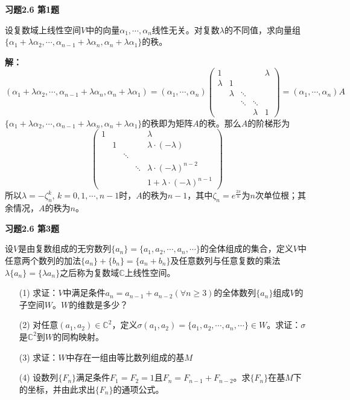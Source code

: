 \newpageorvspace

{\bf 习题2.6 第1题}

设复数域上线性空间$V$中的向量$\alpha_1,\cdots,\alpha_n$线性无关。对复数$\lambda$的不同值，求向量组$\{ \alpha_1+\lambda\alpha_2, \cdots, \alpha_{n-1}+\lambda\alpha_n, \alpha_n+\lambda\alpha_1 \}$的秩。

{\bf 解：}
$$(\alpha_1+\lambda\alpha_2, \cdots, \alpha_{n-1}+\lambda\alpha_n, \alpha_n+\lambda\alpha_1) = (\alpha_1,\cdots,\alpha_n) \begin{pmatrix}
1 & & & & \lambda \\ \lambda & 1 & & & \\ & \lambda & \ddots & & \\ & & \ddots & \ddots & \\ & & & \lambda & 1
\end{pmatrix} = (\alpha_1,\cdots,\alpha_n)A$$
$\{ \alpha_1+\lambda\alpha_2, \cdots, \alpha_{n-1}+\lambda\alpha_n, \alpha_n+\lambda\alpha_1 \}$的秩即为矩阵$A$的秩。那么$A$的阶梯形为
$$
\begin{pmatrix}
1 & & & & \lambda \\ & 1 & & & \lambda\cdot(-\lambda) \\ & & \ddots & & \\ & & & \ddots & \lambda\cdot(-\lambda)^{n-2} \\ & & & & 1 + \lambda\cdot(-\lambda)^{n-1}
\end{pmatrix}
$$
所以$\lambda = -\zeta_{n}^k$, $k=0,1,\cdots, n-1$时，$A$的秩为$n-1$，其中$\zeta_{n} = e^{\frac{2\pi}{n}}$为$n$次单位根；其余情况，$A$的秩为$n$。

\newpageorvspace

{\bf 习题2.6 第3题}

设$V$是由复数组成的无穷数列$\{a_n\} = \{ a_1,a_2,\cdots,a_n,\cdots \}$的全体组成的集合，定义$V$中任意两个数列的加法$\{a_n\} + \{b_n\} = \{a_n+b_n\}$及任意数列与任意复数的乘法$\lambda\{a_n\} = \{\lambda a_n\}$之后称为复数域$\mathbb{C}$上线性空间。
\begin{itemize}
\item[(1)] 求证：$V$中满足条件$a_n = a_{n-1}+a_{n-2} (\forall n \geqslant 3)$的全体数列$\{a_n\}$组成$V$的子空间$W$。$W$的维数是多少？
\item[(2)] 对任意$(a_1,a_2)\in\mathbb{C}^2$，定义$\sigma(a_1,a_2) = \{ a_1,a_2,\cdots,a_n,\cdots \} \in W$。求证：$\sigma$是$\mathbb{C}^2$到$W$的同构映射。
\item[(3)] 求证：$W$中存在一组由等比数列组成的基$M$
\item[(4)] 设数列$\{F_n\}$满足条件$F_1 = F_2 = 1$且$F_n = F_{n-1} + F_{n-2}$。求$\{F_n\}$在基$M$下的坐标，并由此求出$\{F_n\}$的通项公式。
\end{itemize}

